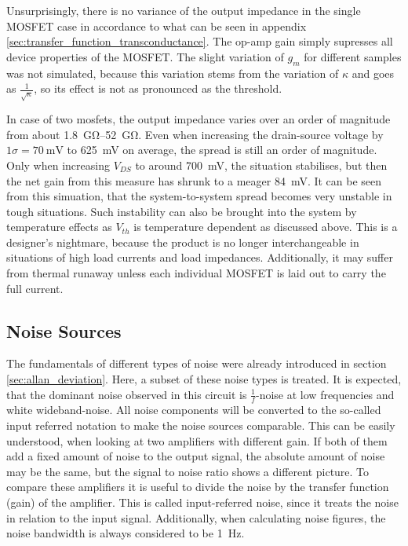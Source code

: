 Unsurprisingly, there is no variance of the output impedance in the single MOSFET case in accordance to what can be seen in appendix \ref{sec:transfer_function_transconductance}. The op-amp gain simply supresses all device properties of the MOSFET. The slight variation of $g_m$ for different samples was not simulated, because this variation stems from the variation of $\kappa$ and goes as $\frac{1}{\sqrt{\kappa}}$, so its effect is not as pronounced as the threshold.

In case of two mosfets, the output impedance varies over an order of magnitude from about \qtyrange[range-units = single]{1.8}{52}{\giga \ohm}. Even when increasing the drain-source voltage by $1 \sigma = \qty{70}{\mV}$ to \qty{625}{\mV} on average, the spread is still an order of magnitude. Only when increasing $V_{DS}$ to around \qty{700}{\mV}, the situation stabilises, but then the net gain from this measure has shrunk to a meager \qty{84}{\mV}. It can be seen from this simuation, that the system-to-system spread becomes very unstable in tough situations. Such instability can also be brought into the system by temperature effects as $V_{th}$ is temperature dependent as discussed above. This is a designer's nightmare, because the product is no longer interchangeable in situations of high load currents and load impedances. Additionally, it may suffer from thermal runaway unless each individual MOSFET is laid out to carry the full current.

\clearpage
\subsection{Noise Sources}%
\label{sec:current_source_noise}
The fundamentals of different types of noise were already introduced in section \ref{sec:allan_deviation}. Here, a subset of these noise types is treated. It is expected, that the dominant noise observed in this circuit is $\frac{1}{f}$-noise at low frequencies and white wideband-noise. All noise components will be converted to the so-called input referred notation to make the noise sources comparable. This can be easily understood, when looking at two amplifiers with different gain. If both of them add a fixed amount of noise to the output signal, the absolute amount of noise may be the same, but the signal to noise ratio shows a different picture. To compare these amplifiers it is useful to divide the noise by the transfer function (gain) of the amplifier. This is called input-referred noise, since it treats the noise in relation to the input signal. Additionally, when calculating noise figures, the noise bandwidth is always considered to be \qty{1}{\Hz}.

